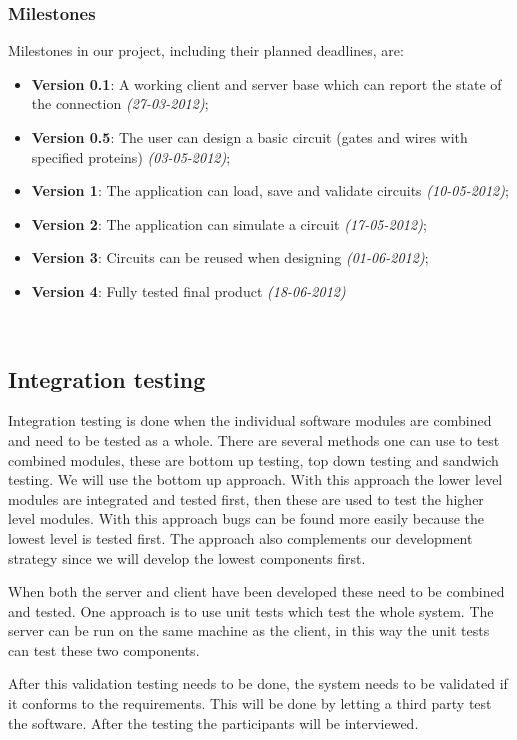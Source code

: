 \documentclass[a4paper]{article}
\begin{document}
\subsubsection{Milestones}
Milestones in our project, including their planned deadlines, are:
\begin{itemize}
\item \textbf{Version 0.1}: A working client and server base which can report the state of the connection \emph{(27-03-2012)};
\item \textbf{Version 0.5}: The user can design a basic circuit (gates and wires with specified proteins) \emph{(03-05-2012)};
\item \textbf{Version 1}: The application can load, save and validate circuits \emph{(10-05-2012)};
\item \textbf{Version 2}: The application can simulate a circuit \emph{(17-05-2012)};
\item \textbf{Version 3}: Circuits can be reused when designing \emph{(01-06-2012)};
\item \textbf{Version 4}: Fully tested final product \emph{(18-06-2012)}
\end{itemize}~\\




\subsection{Integration testing}
Integration testing is done when the individual software modules are combined and need to be tested as a whole. There are several methods one can use to test combined modules, these are bottom up testing, top down testing and sandwich testing. We will use the bottom up approach. With this approach the lower level modules are integrated and tested first, then these are used to test the higher level modules. With this approach bugs can be found more easily because the lowest level is tested first. The approach also complements our development strategy since we will develop the lowest components first.

When both the server and client have been developed these need to be combined and tested. One approach is to use unit tests which test the whole system. The server can be run on the same machine as the client, in this way the unit tests can test these two components.

After this validation testing needs to be done, the system needs to be validated if it conforms to the requirements. This will be done by letting a third party test the software. After the testing the participants will be interviewed.
\end{document}
